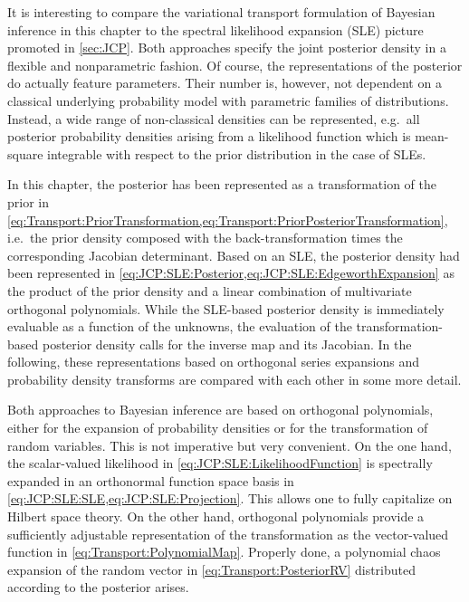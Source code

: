 It is interesting to compare the variational transport formulation of Bayesian inference in this chapter
to the spectral likelihood expansion (SLE) picture promoted in \cref{sec:JCP}.
Both approaches specify the joint posterior density in a flexible and nonparametric fashion.
Of course, the representations of the posterior do actually feature parameters.
Their number is, however, not dependent on a classical underlying probability model with parametric families of distributions.
Instead, a wide range of non-classical densities can be represented,
e.g.\ all posterior probability densities arising from a likelihood function which is mean-square integrable with respect to the prior distribution in the case of SLEs.
\par %
In this chapter, the posterior has been represented as a transformation of the prior in \cref{eq:Transport:PriorTransformation,eq:Transport:PriorPosteriorTransformation},
i.e.\ the prior density composed with the back-transformation times the corresponding Jacobian determinant.
Based on an SLE, the posterior density had been represented in \cref{eq:JCP:SLE:Posterior,eq:JCP:SLE:EdgeworthExpansion}
as the product of the prior density and a linear combination of multivariate orthogonal polynomials.
While the SLE-based posterior density is immediately evaluable as a function of the unknowns,
the evaluation of the transformation-based posterior density calls for the inverse map and its Jacobian.
In the following, these representations based on orthogonal series expansions and probability density transforms are compared with each other in some more detail.
\par %
Both approaches to Bayesian inference are based on orthogonal polynomials, either for the expansion of probability densities or for the transformation of random variables.
This is not imperative but very convenient.
On the one hand, the scalar-valued likelihood in \cref{eq:JCP:SLE:LikelihoodFunction} is spectrally expanded
in an orthonormal function space basis in \cref{eq:JCP:SLE:SLE,eq:JCP:SLE:Projection}.
This allows one to fully capitalize on Hilbert space theory.
On the other hand, orthogonal polynomials provide a sufficiently adjustable representation of the transformation as the vector-valued function in \cref{eq:Transport:PolynomialMap}.
Properly done, a polynomial chaos expansion of the random vector in \cref{eq:Transport:PosteriorRV} distributed according to the posterior arises.
\par %
